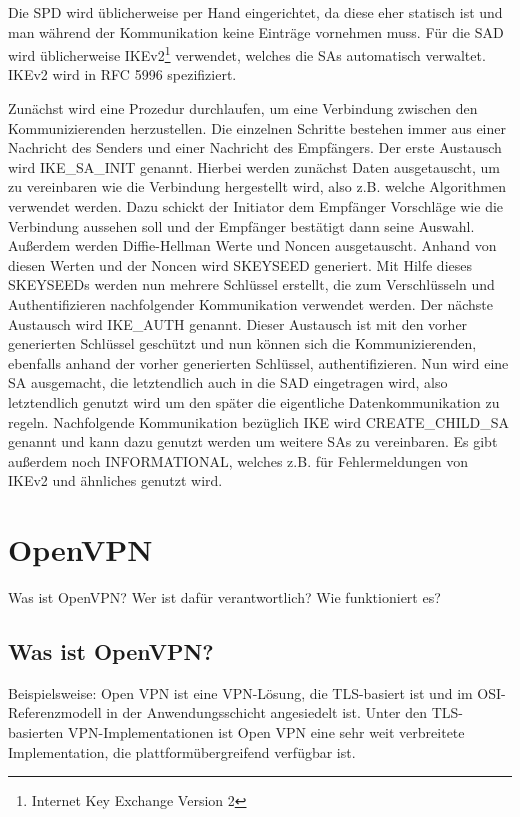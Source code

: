 \documentclass[12pt]{scrartcl}
\begin{document}
Die SPD wird üblicherweise per Hand eingerichtet, da diese eher statisch ist und man während der Kommunikation keine Einträge vornehmen muss. Für die SAD wird üblicherweise IKEv2\footnote{Internet Key Exchange Version 2} verwendet, welches die SAs automatisch verwaltet. IKEv2 wird in RFC 5996 spezifiziert.\cite{RFC5996}

Zunächst wird eine Prozedur durchlaufen, um eine Verbindung zwischen den Kommunizierenden herzustellen. Die einzelnen Schritte bestehen immer aus einer Nachricht des Senders und einer Nachricht des Empfängers. Der erste Austausch wird IKE\_SA\_INIT genannt. Hierbei werden zunächst Daten ausgetauscht, um zu vereinbaren wie die Verbindung hergestellt wird, also z.B. welche Algorithmen verwendet werden. Dazu schickt der Initiator dem Empfänger Vorschläge wie die Verbindung aussehen soll und der Empfänger bestätigt dann seine Auswahl. Außerdem werden Diffie-Hellman Werte und Noncen ausgetauscht. Anhand von diesen Werten und der Noncen wird SKEYSEED generiert. Mit Hilfe dieses SKEYSEEDs werden nun mehrere Schlüssel erstellt, die zum Verschlüsseln und Authentifizieren nachfolgender Kommunikation verwendet werden. Der nächste Austausch wird IKE\_AUTH genannt. Dieser Austausch ist mit den vorher generierten Schlüssel geschützt und nun können sich die Kommunizierenden, ebenfalls anhand der vorher generierten Schlüssel, authentifizieren. Nun wird eine SA ausgemacht, die letztendlich auch in die SAD eingetragen wird, also letztendlich genutzt wird um den später die eigentliche Datenkommunikation zu regeln.
Nachfolgende Kommunikation bezüglich IKE wird CREATE\_CHILD\_SA genannt und kann dazu genutzt werden um weitere SAs zu vereinbaren. Es gibt außerdem noch INFORMATIONAL, welches z.B. für Fehlermeldungen von IKEv2 und ähnliches genutzt wird.
\section{OpenVPN}
%
Was ist OpenVPN? Wer ist dafür verantwortlich? Wie funktioniert es?

\subsection{Was ist OpenVPN?}
Beispielsweise:
Open VPN ist eine VPN-Lösung, die TLS-basiert ist und im OSI-Referenzmodell in der Anwendungsschicht angesiedelt ist. Unter den TLS-basierten VPN-Implementationen ist Open VPN eine sehr weit verbreitete Implementation, die plattformübergreifend verfügbar ist.
\end{document}

